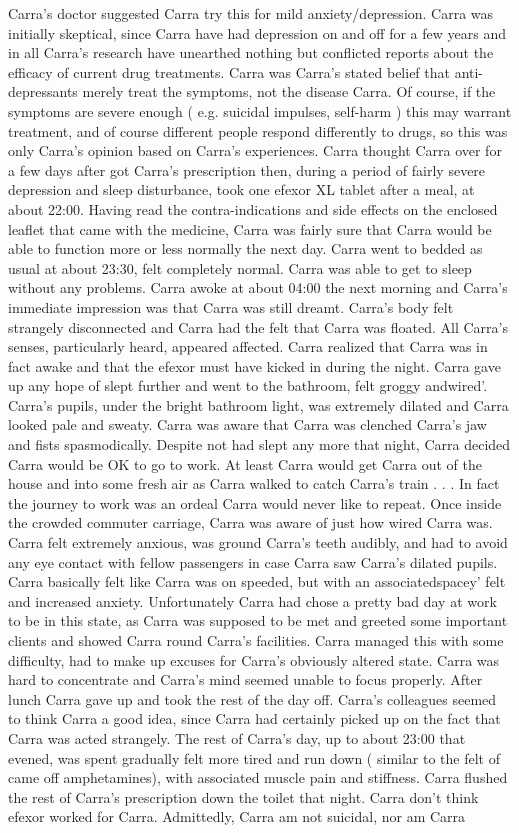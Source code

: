 \documentclass[12pt]{book}
\begin{document}
Carra's doctor suggested Carra try this for mild anxiety/depression. Carra was initially skeptical, since Carra have had depression on and off for a few years and in all Carra's research have unearthed nothing but conflicted reports about the efficacy of current drug treatments. Carra was Carra's stated belief that anti-depressants merely treat the symptoms, not the disease Carra. Of course, if the symptoms are severe enough ( e.g. suicidal impulses, self-harm ) this may warrant treatment, and of course different people respond differently to drugs, so this was only Carra's opinion based on Carra's experiences. Carra thought Carra over for a few days after got Carra's prescription then, during a period of fairly severe depression and sleep disturbance, took one efexor XL tablet after a meal, at about 22:00. Having read the contra-indications and side effects on the enclosed leaflet that came with the medicine, Carra was fairly sure that Carra would be able to function more or less normally the next day. Carra went to bedded as usual at about 23:30, felt completely normal. Carra was able to get to sleep without any problems. Carra awoke at about 04:00 the next morning and Carra's immediate impression was that Carra was still dreamt. Carra's body felt strangely disconnected and Carra had the felt that Carra was floated. All Carra's senses, particularly heard, appeared affected. Carra realized that Carra was in fact awake and that the efexor must have kicked in during the night. Carra gave up any hope of slept further and went to the bathroom, felt groggy andwired'. Carra's pupils, under the bright bathroom light, was extremely dilated and Carra looked pale and sweaty. Carra was aware that Carra was clenched Carra's jaw and fists spasmodically. Despite not had slept any more that night, Carra decided Carra would be OK to go to work. At least Carra would get Carra out of the house and into some fresh air as Carra walked to catch Carra's train . . .  In fact the journey to work was an ordeal Carra would never like to repeat. Once inside the crowded commuter carriage, Carra was aware of just how wired Carra was. Carra felt extremely anxious, was ground Carra's teeth audibly, and had to avoid any eye contact with fellow passengers in case Carra saw Carra's dilated pupils. Carra basically felt like Carra was on speeded, but with an associatedspacey' felt and increased anxiety. Unfortunately Carra had chose a pretty bad day at work to be in this state, as Carra was supposed to be met and greeted some important clients and showed Carra round Carra's facilities. Carra managed this with some difficulty, had to make up excuses for Carra's obviously altered state. Carra was hard to concentrate and Carra's mind seemed unable to focus properly. After lunch Carra gave up and took the rest of the day off. Carra's colleagues seemed to think Carra a good idea, since Carra had certainly picked up on the fact that Carra was acted strangely. The rest of Carra's day, up to about 23:00 that evened, was spent gradually felt more tired and run down ( similar to the felt of came off amphetamines), with associated muscle pain and stiffness. Carra flushed the rest of Carra's prescription down the toilet that night. Carra don't think efexor worked for Carra. Admittedly, Carra am not suicidal, nor am Carra 
\end{document}
